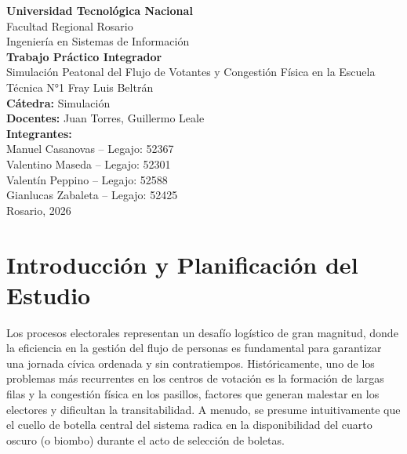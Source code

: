 \documentclass[11pt,a4paper]{article}
\begin{document}
\begin{titlepage}
    \centering
    \LARGE \textbf{Universidad Tecnológica Nacional}\\
    \Large Facultad Regional Rosario\\
    \large Ingeniería en Sistemas de Información\\[2.5cm]
    
    \Huge \textbf{Trabajo Práctico Integrador}\\
    \vspace{0.5cm}
    \LARGE Simulación Peatonal del Flujo de Votantes y Congestión Física en la Escuela Técnica N°1 Fray Luis Beltrán\\[2.5cm]
    
    \large
    \textbf{Cátedra:} Simulación\\
    \textbf{Docentes:} Juan Torres, Guillermo Leale\\[1.5cm]
    
    \textbf{Integrantes:}\\
    Manuel Casanovas -- Legajo: 52367\\
    Valentino Maseda -- Legajo: 52301\\
    Valentín Peppino -- Legajo: 52588\\
    Gianlucas Zabaleta -- Legajo: 52425\\[2cm]
    
    \vfill
    \large Rosario, 2026
\end{titlepage}

\tableofcontents
\newpage

\section{Introducción y Planificación del Estudio}

Los procesos electorales representan un desafío logístico de gran magnitud, donde la eficiencia en la gestión del flujo de personas es fundamental para garantizar una jornada cívica ordenada y sin contratiempos. Históricamente, uno de los problemas más recurrentes en los centros de votación es la formación de largas filas y la congestión física en los pasillos, factores que generan malestar en los electores y dificultan la transitabilidad. A menudo, se presume intuitivamente que el cuello de botella central del sistema radica en la disponibilidad del cuarto oscuro (o biombo) durante el acto de selección de boletas.
\end{document}
